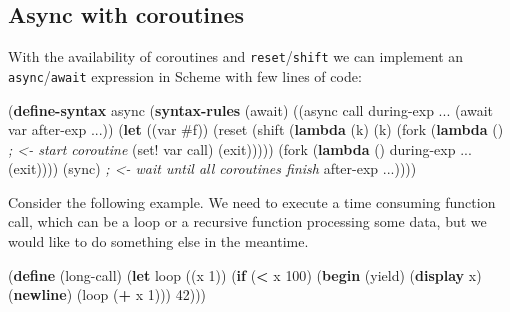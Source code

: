 \documentclass[12pt,a4paper,oneside,openright]{book}
\newenvironment{Shaded}{\begin{snugshade}}{\end{snugshade}}
\newcommand{\KeywordTok}[1]{\textcolor[rgb]{0.13,0.29,0.53}{\textbf{{#1}}}}
\newcommand{\DecValTok}[1]{\textcolor[rgb]{0.00,0.00,0.81}{{#1}}}
\newcommand{\CommentTok}[1]{\textcolor[rgb]{0.56,0.35,0.01}{\textit{{#1}}}}
\newcommand{\FunctionTok}[1]{\textcolor[rgb]{0.00,0.00,0.00}{{#1}}}
\newcommand{\NormalTok}[1]{{#1}}
\begin{document}
\subsection{Async with coroutines}\label{async-with-coroutines}

With the availability of coroutines and \texttt{reset}/\texttt{shift} we
can implement an \texttt{async}/\texttt{await} expression in Scheme with
few lines of code:

\begin{Shaded}
\begin{Highlighting}[]
    \NormalTok{(}\KeywordTok{define-syntax}\FunctionTok{ async}
      \NormalTok{(}\KeywordTok{syntax-rules} \NormalTok{(await)}
        \NormalTok{((async call during-exp ...}
           \NormalTok{(await var after-exp ...))}
         \NormalTok{(}\KeywordTok{let} \NormalTok{((var }\DecValTok{#f}\NormalTok{))}
            \NormalTok{(reset}
              \NormalTok{(shift (}\KeywordTok{lambda} \NormalTok{(k)}
                      \NormalTok{(k)}
                      \NormalTok{(fork (}\KeywordTok{lambda} \NormalTok{() }\CommentTok{; <- start coroutine}
                              \NormalTok{(set! var call)}
                              \NormalTok{(exit)))))}
              \NormalTok{(fork (}\KeywordTok{lambda} \NormalTok{() during-exp ... (exit))))}
            \NormalTok{(sync) }\CommentTok{; <- wait until all coroutines finish}
            \NormalTok{after-exp ...))))}
\end{Highlighting}
\end{Shaded}

Consider the following example. We need to execute a time consuming
function call, which can be a loop or a recursive function processing
some data, but we would like to do something else in the meantime.

\begin{Shaded}
\begin{Highlighting}[]
    \NormalTok{(}\KeywordTok{define}\FunctionTok{ }\NormalTok{(long-call)}
      \NormalTok{(}\KeywordTok{let} \NormalTok{loop ((x }\DecValTok{1}\NormalTok{))}
        \NormalTok{(}\KeywordTok{if} \NormalTok{(}\KeywordTok{<} \NormalTok{x }\DecValTok{100}\NormalTok{)}
          \NormalTok{(}\KeywordTok{begin} \NormalTok{(yield)}
                 \NormalTok{(}\KeywordTok{display} \NormalTok{x)}
                 \NormalTok{(}\KeywordTok{newline}\NormalTok{)}
                 \NormalTok{(loop (}\KeywordTok{+} \NormalTok{x }\DecValTok{1}\NormalTok{)))}
          \DecValTok{42}\NormalTok{)))}
\end{Highlighting}
\end{Shaded}
\end{document}
